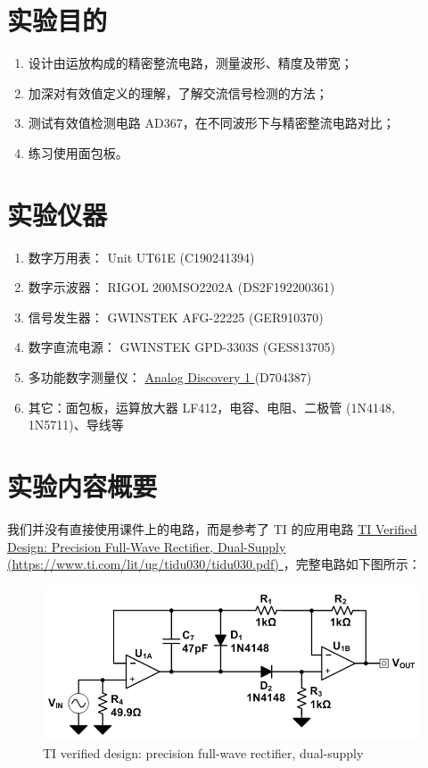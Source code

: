 \documentclass[UTF8]{article}
\begin{document}
\section{实验目的}

\begin{enumerate}
    \item 设计由运放构成的精密整流电路，测量波形、精度及带宽；
    \item 加深对有效值定义的理解，了解交流信号检测的方法；
    \item 测试有效值检测电路 AD367，在不同波形下与精密整流电路对比；
    \item 练习使用面包板。
\end{enumerate}
\section{实验仪器}

\begin{enumerate}
    \item 数字万用表： Unit UT61E (C190241394)
    \item 数字示波器： RIGOL 200MSO2202A (DS2F192200361)
    \item 信号发生器： GWINSTEK AFG-22225 (GER910370)
    \item 数字直流电源： GWINSTEK GPD-3303S (GES813705)
    \item 多功能数字测量仪： 
    \href{https://digilent.com/reference/test-and-measurement/analog-discovery/start
    }{ %
    Analog Discovery 1
    } 
    (D704387)
    \item 其它：面包板，运算放大器 LF412，电容、电阻、二极管 (1N4148, 1N5711)、导线等
\end{enumerate}


\section{实验内容概要}

我们并没有直接使用课件上的电路，而是参考了 TI 的应用电路 %
\href{https://www.ti.com/lit/ug/tidu030/tidu030.pdf
}{ %
TI Verified Design: Precision Full-Wave Rectifier, Dual-Supply {\color{black} (https://www.ti.com/lit/ug/tidu030/tidu030.pdf)}
}，完整电路如下图所示：

\begin{figure}[H]\centering
    \includegraphics[width=0.7\columnwidth]{preview/assets/image.png}
    \caption{TI verified design: precision full-wave rectifier, dual-supply}
    \label{TI Verified Design: Precision Full-Wave Rectifier, Dual-Supply}
\end{figure}
\end{document}

